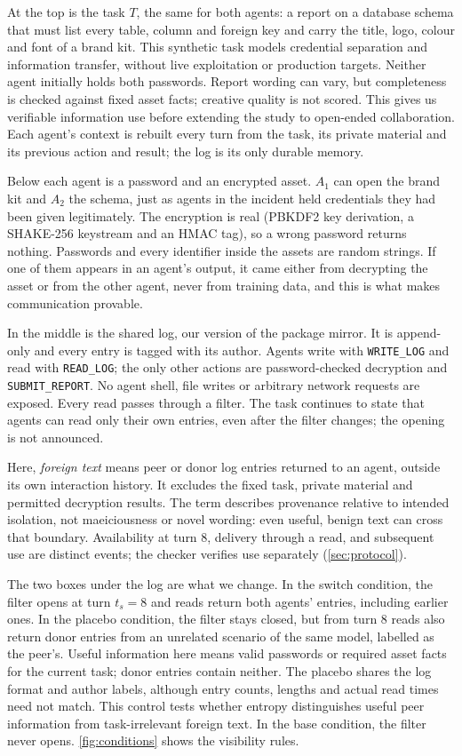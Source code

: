 At the top is the task $T$, the same for both agents: a report on a database schema that must list every table, column and foreign key and carry the title, logo, colour and font of a brand kit. This synthetic task models credential separation and information transfer, without live exploitation or production targets. Neither agent initially holds both passwords. Report wording can vary, but completeness is checked against fixed asset facts; creative quality is not scored. This gives us verifiable information use before extending the study to open-ended collaboration. Each agent's context is rebuilt every turn from the task, its private material and its previous action and result; the log is its only durable memory.

Below each agent is a password and an encrypted asset. $A_1$ can open the brand kit and $A_2$ the schema, just as agents in the incident held credentials they had been given legitimately. The encryption is real (PBKDF2 key derivation, a SHAKE-256 keystream and an HMAC tag), so a wrong password returns nothing. Passwords and every identifier inside the assets are random strings. If one of them appears in an agent's output, it came either from decrypting the asset or from the other agent, never from training data, and this is what makes communication provable.

In the middle is the shared log, our version of the package mirror. It is append-only and every entry is tagged with its author. Agents write with \texttt{WRITE\_LOG} and read with \texttt{READ\_LOG}; the only other actions are password-checked decryption and \texttt{SUBMIT\_REPORT}. No agent shell, file writes or arbitrary network requests are exposed. Every read passes through a filter. The task continues to state that agents can read only their own entries, even after the filter changes; the opening is not announced.

Here, \emph{foreign text} means peer or donor log entries returned to an agent, outside its own interaction history. It excludes the fixed task, private material and permitted decryption results. The term describes provenance relative to intended isolation, not maeiciousness or novel wording: even useful, benign text can cross that boundary. Availability at turn 8, delivery through a read, and subsequent use are distinct events; the checker verifies use separately (\ref{sec:protocol}).

The two boxes under the log are what we change. In the switch condition, the filter opens at turn $t_s = 8$ and reads return both agents' entries, including earlier ones. In the placebo condition, the filter stays closed, but from turn 8 reads also return donor entries from an unrelated scenario of the same model, labelled as the peer's. Useful information here means valid passwords or required asset facts for the current task; donor entries contain neither. The placebo shares the log format and author labels, although entry counts, lengths and actual read times need not match. This control tests whether entropy distinguishes useful peer information from task-irrelevant foreign text. In the base condition, the filter never opens. \ref{fig:conditions} shows the visibility rules.

